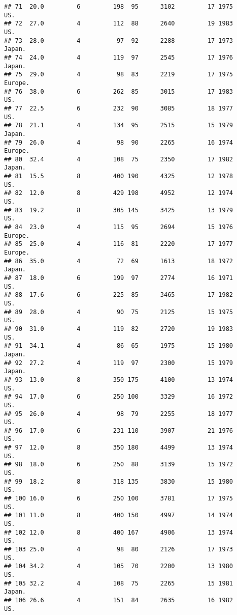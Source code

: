 \documentclass[11pt,]{article}
\begin{document}
\begin{verbatim}
## 71  20.0         6         198  95      3102         17 1975      US.
## 72  27.0         4         112  88      2640         19 1983      US.
## 73  28.0         4          97  92      2288         17 1973   Japan.
## 74  24.0         4         119  97      2545         17 1976   Japan.
## 75  29.0         4          98  83      2219         17 1975  Europe.
## 76  38.0         6         262  85      3015         17 1983      US.
## 77  22.5         6         232  90      3085         18 1977      US.
## 78  21.1         4         134  95      2515         15 1979   Japan.
## 79  26.0         4          98  90      2265         16 1974  Europe.
## 80  32.4         4         108  75      2350         17 1982   Japan.
## 81  15.5         8         400 190      4325         12 1978      US.
## 82  12.0         8         429 198      4952         12 1974      US.
## 83  19.2         8         305 145      3425         13 1979      US.
## 84  23.0         4         115  95      2694         15 1976  Europe.
## 85  25.0         4         116  81      2220         17 1977  Europe.
## 86  35.0         4          72  69      1613         18 1972   Japan.
## 87  18.0         6         199  97      2774         16 1971      US.
## 88  17.6         6         225  85      3465         17 1982      US.
## 89  28.0         4          90  75      2125         15 1975      US.
## 90  31.0         4         119  82      2720         19 1983      US.
## 91  34.1         4          86  65      1975         15 1980   Japan.
## 92  27.2         4         119  97      2300         15 1979   Japan.
## 93  13.0         8         350 175      4100         13 1974      US.
## 94  17.0         6         250 100      3329         16 1972      US.
## 95  26.0         4          98  79      2255         18 1977      US.
## 96  17.0         6         231 110      3907         21 1976      US.
## 97  12.0         8         350 180      4499         13 1974      US.
## 98  18.0         6         250  88      3139         15 1972      US.
## 99  18.2         8         318 135      3830         15 1980      US.
## 100 16.0         6         250 100      3781         17 1975      US.
## 101 11.0         8         400 150      4997         14 1974      US.
## 102 12.0         8         400 167      4906         13 1974      US.
## 103 25.0         4          98  80      2126         17 1973      US.
## 104 34.2         4         105  70      2200         13 1980      US.
## 105 32.2         4         108  75      2265         15 1981   Japan.
## 106 26.6         4         151  84      2635         16 1982      US.

\end{verbatim}
\end{document}
